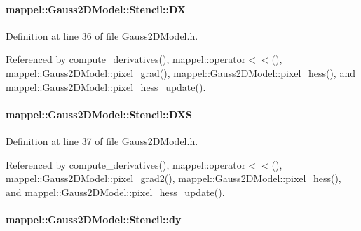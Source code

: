 \paragraph[{\texorpdfstring{DX}{DX}}]{ mappel\+::\+Gauss2\+D\+Model\+::\+Stencil\+::\+DX}\hypertarget{classmappel_1_1Gauss2DModel_1_1Stencil_a393169d632114c7ff5d55920935919e4}{}\label{classmappel_1_1Gauss2DModel_1_1Stencil_a393169d632114c7ff5d55920935919e4}


Definition at line 36 of file Gauss2\+D\+Model.\+h.



Referenced by compute\+\_\+derivatives(), mappel\+::operator$<$$<$(), mappel\+::\+Gauss2\+D\+Model\+::pixel\+\_\+grad(), mappel\+::\+Gauss2\+D\+Model\+::pixel\+\_\+hess(), and mappel\+::\+Gauss2\+D\+Model\+::pixel\+\_\+hess\+\_\+update().

\paragraph[{\texorpdfstring{D\+XS}{DXS}}]{ mappel\+::\+Gauss2\+D\+Model\+::\+Stencil\+::\+D\+XS}\hypertarget{classmappel_1_1Gauss2DModel_1_1Stencil_abd31416e7475994f2a0c8a1b0f1564d4}{}\label{classmappel_1_1Gauss2DModel_1_1Stencil_abd31416e7475994f2a0c8a1b0f1564d4}


Definition at line 37 of file Gauss2\+D\+Model.\+h.



Referenced by compute\+\_\+derivatives(), mappel\+::operator$<$$<$(), mappel\+::\+Gauss2\+D\+Model\+::pixel\+\_\+grad2(), mappel\+::\+Gauss2\+D\+Model\+::pixel\+\_\+hess(), and mappel\+::\+Gauss2\+D\+Model\+::pixel\+\_\+hess\+\_\+update().

\paragraph[{\texorpdfstring{dy}{dy}}]{ mappel\+::\+Gauss2\+D\+Model\+::\+Stencil\+::dy}\hypertarget{classmappel_1_1Gauss2DModel_1_1Stencil_ad5f76b9e7f4c9ca69b4177afc997b1a9}{}\label{classmappel_1_1Gauss2DModel_1_1Stencil_ad5f76b9e7f4c9ca69b4177afc997b1a9}


